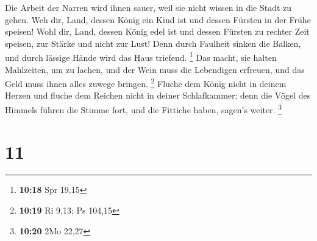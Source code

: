  Die Arbeit der Narren wird ihnen sauer, weil sie nicht
wissen in die Stadt zu gehen.  Weh dir, Land, dessen
König ein Kind ist und dessen Fürsten in der Frühe speisen!
 Wohl dir, Land, dessen König edel ist und dessen Fürsten
zu rechter Zeit speisen, zur Stärke und nicht zur Lust! 
Denn durch Faulheit sinken die Balken, und durch lässige Hände wird das
Haus triefend. \footnote{\textbf{10:18} Spr 19,15}  Das
macht, sie halten Mahlzeiten, um zu lachen, und der Wein muss die
Lebendigen erfreuen, und das Geld muss ihnen alles zuwege bringen.
\footnote{\textbf{10:19} Ri 9,13; Ps 104,15}  Fluche dem
König nicht in deinem Herzen und fluche dem Reichen nicht in deiner
Schlafkammer; denn die Vögel des Himmels führen die Stimme fort, und die
Fittiche haben, sagen's weiter. \footnote{\textbf{10:20} 2Mo 22,27}

\hypertarget{section-4}{%
\section{11}\label{section-4}}

